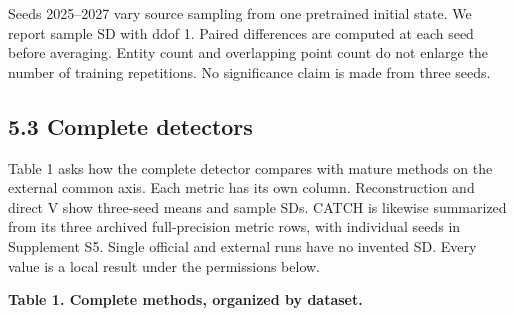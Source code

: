 \documentclass[
  english,
  10pt,
]{article}
\begin{document}
Seeds 2025--2027 vary source sampling from one pretrained initial state.
We report sample SD with ddof 1. Paired differences are computed at each
seed before averaging. Entity count and overlapping point count do not
enlarge the number of training repetitions. No significance claim is
made from three seeds.

\subsection{5.3 Complete detectors}\label{complete-detectors}

Table 1 asks how the complete detector compares with mature methods on
the external common axis. Each metric has its own column. Reconstruction
and direct V show three-seed means and sample SDs. CATCH is likewise
summarized from its three archived full-precision metric rows, with
individual seeds in Supplement S5. Single official and external runs
have no invented SD. Every value is a local result under the permissions
below.

\textbf{Table 1. Complete methods, organized by dataset.}
\end{document}
